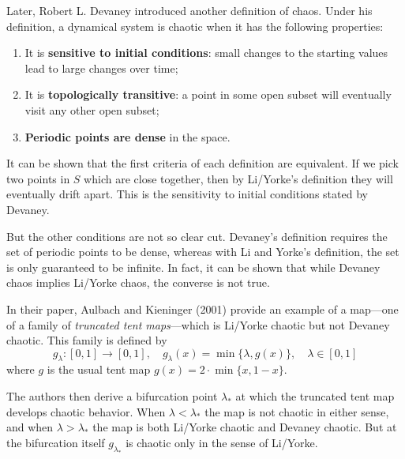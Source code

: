 \documentclass{article}
\begin{document}
Later, Robert L. Devaney introduced another definition of chaos. Under his definition, a dynamical system is chaotic when it has the following properties:

\begin{enumerate}
    \item It is \textbf{sensitive to initial conditions}: small changes to the starting values lead to large changes over time;
    \item It is \textbf{topologically transitive}: a point in some open subset will eventually visit any other open subset;
    \item \textbf{Periodic points are dense} in the space.\cite{MR1157223}
\end{enumerate}

It can be shown that the first criteria of each definition are equivalent. If we pick two points in $S$ which are close together, then by Li/Yorke's definition they will eventually drift apart. This is the sensitivity to initial conditions stated by Devaney.

But the other conditions are not so clear cut. Devaney's definition requires the set of periodic points to be dense, whereas with Li and Yorke's definition, the set is only guaranteed to be infinite. In fact, it can be shown that while Devaney chaos implies Li/Yorke chaos, the converse is not true.\cite{MR1989572}

In their paper, Aulbach and Kieninger (2001) provide an example of a map---one of a family of \emph{truncated tent maps}---which is Li/Yorke chaotic but not Devaney chaotic. This family is defined by
\[
    g_\lambda : [0, 1] \rightarrow [0, 1],\quad
    g_\lambda(x) = \min\{\lambda, g(x)\},\quad
    \lambda \in [0, 1]
\]
where $g$ is the usual tent map $g(x) = 2\cdot\min\{x, 1 - x\}$.

The authors then derive a bifurcation point $\lambda_*$ at which the truncated tent map develops chaotic behavior. When $\lambda < \lambda_*$ the map is not chaotic in either sense, and when $\lambda > \lambda_*$ the map is both Li/Yorke chaotic and Devaney chaotic. But at the bifurcation itself $g_{\lambda_*}$ is chaotic only in the sense of Li/Yorke.



\end{document}
